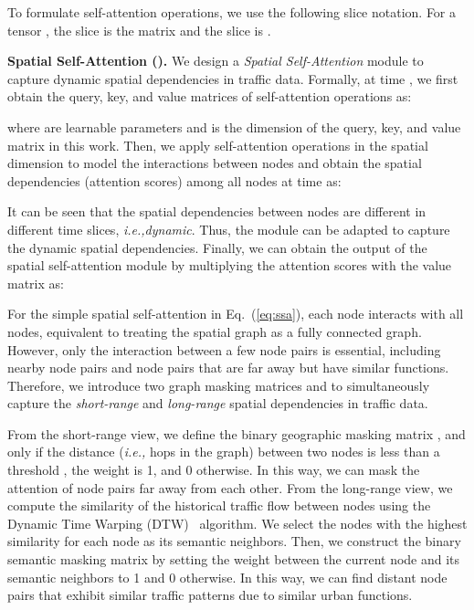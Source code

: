 \documentclass[letterpaper]{article} \usepackage{aaai23}  \usepackage{times}  \usepackage{helvet}  \usepackage{courier}  \usepackage[hyphens]{url}  \usepackage{graphicx} \urlstyle{rm} \def\UrlFont{\rm}  \usepackage{natbib}  \usepackage{caption} \frenchspacing  \setlength{\pdfpagewidth}{8.5in} \setlength{\pdfpageheight}{11in} \usepackage{algorithm}
\newcommand{\paratitle}[1]{\vspace{1.5ex}\noindent\textbf{#1}}
\newcommand{\ie}{\emph{i.e.,}\xspace}
\newcommand{\ssa}{\xspace}
\begin{document}
To formulate self-attention operations, we use the following slice notation. For a tensor , the  slice is the matrix  and the  slice is .



\paratitle{Spatial Self-Attention (\ssa).} We design a \emph{Spatial Self-Attention} module to capture dynamic spatial dependencies in traffic data. Formally, at time , we first obtain the query, key, and value matrices of self-attention operations as:

where  are learnable parameters and  is the dimension of the query, key, and value matrix in this work. Then, we apply self-attention operations in the spatial dimension to model the interactions between nodes and obtain the spatial dependencies (attention scores) among all nodes at time  as:

It can be seen that the spatial dependencies  between nodes are different in different time slices, \ie \emph{dynamic}. Thus, the \ssa module can be adapted to capture the dynamic spatial dependencies. Finally, we can obtain the output of the spatial self-attention module by multiplying the attention scores with the value matrix as:








For the simple spatial self-attention in Eq.~(\ref{eq:ssa}), each node interacts with all nodes, equivalent to treating the spatial graph as a fully connected graph. However, only the interaction between a few node pairs is essential, including nearby node pairs and node pairs that are far away but have similar functions. Therefore, we introduce two graph masking matrices  and  to simultaneously capture the \emph{short-range} and \emph{long-range} spatial dependencies in traffic data.

From the short-range view, we define the binary geographic masking matrix , and only if the distance (\ie hops in the graph) between two nodes is less than a threshold , the weight is 1, and 0 otherwise. In this way, we can mask the attention of node pairs far away from each other. From the long-range view, we compute the similarity of the historical traffic flow between nodes using the Dynamic Time Warping (DTW)~\cite{dtw} algorithm. We select the  nodes with the highest similarity for each node as its semantic neighbors. Then, we construct the binary semantic masking matrix  by setting the weight between the current node and its semantic neighbors to 1 and 0 otherwise. In this way, we can find distant node pairs that exhibit similar traffic patterns due to similar urban functions.
\end{document}

